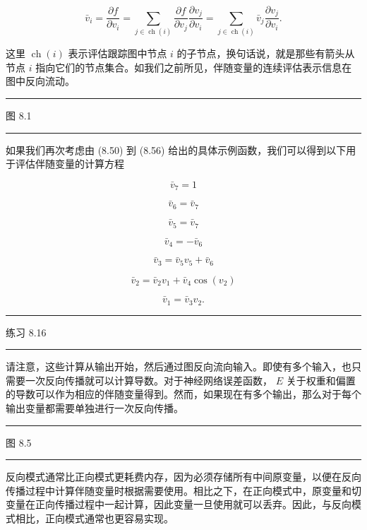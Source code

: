 \documentclass[10pt]{article}
\newcommand{\HRule}{\begin{center}\rule{0.9\linewidth}{0.2mm}\end{center}}
\begin{document}
\[
{\bar{v}}_{i} = \frac{\partial f}{\partial {v}_{i}} = \mathop{\sum }\limits_{{j \in  \operatorname{ch}\left( i\right) }}\frac{\partial f}{\partial {v}_{j}}\frac{\partial {v}_{j}}{\partial {v}_{i}} = \mathop{\sum }\limits_{{j \in  \operatorname{ch}\left( i\right) }}{\bar{v}}_{j}\frac{\partial {v}_{j}}{\partial {v}_{i}}. \tag{8.69}
\]

这里 \(\operatorname{ch}\left( i\right)\) 表示评估跟踪图中节点 \(i\) 的子节点，换句话说，就是那些有箭头从节点 \(i\) 指向它们的节点集合。如我们之前所见，伴随变量的连续评估表示信息在图中反向流动。

\HRule

图 8.1

\HRule

如果我们再次考虑由 (8.50) 到 (8.56) 给出的具体示例函数，我们可以得到以下用于评估伴随变量的计算方程

\[
{\bar{v}}_{7} = 1 \tag{8.70}
\]

\[
{\bar{v}}_{6} = {\bar{v}}_{7} \tag{8.71}
\]

\[
{\bar{v}}_{5} = {\bar{v}}_{7} \tag{8.72}
\]

\[
{\bar{v}}_{4} =  - {\bar{v}}_{6} \tag{8.73}
\]

\[
{\bar{v}}_{3} = {\bar{v}}_{5}{v}_{5} + {\bar{v}}_{6} \tag{8.74}
\]

\[
{\bar{v}}_{2} = {\bar{v}}_{2}{v}_{1} + {\bar{v}}_{4}\cos \left( {v}_{2}\right)  \tag{8.75}
\]

\[
{\bar{v}}_{1} = {\bar{v}}_{3}{v}_{2}. \tag{8.76}
\]

\HRule

练习 8.16

\HRule

请注意，这些计算从输出开始，然后通过图反向流向输入。即使有多个输入，也只需要一次反向传播就可以计算导数。对于神经网络误差函数， \(E\) 关于权重和偏置的导数可以作为相应的伴随变量得到。然而，如果现在有多个输出，那么对于每个输出变量都需要单独进行一次反向传播。

\HRule

图 8.5

\HRule

反向模式通常比正向模式更耗费内存，因为必须存储所有中间原变量，以便在反向传播过程中计算伴随变量时根据需要使用。相比之下，在正向模式中，原变量和切变量在正向传播过程中一起计算，因此变量一旦使用就可以丢弃。因此，与反向模式相比，正向模式通常也更容易实现。
\end{document}
